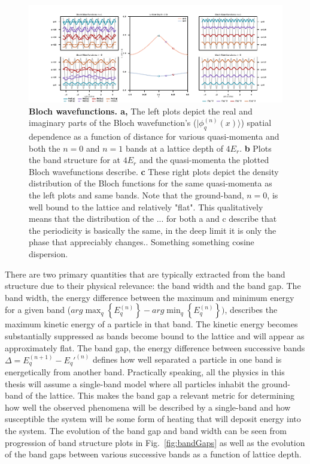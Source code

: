 \begin{figure}[ht!]
		\includegraphics[width=\columnwidth]{figures/ch1/blochFx/BlochFunctionsBS2.pdf} 
		\caption{\textbf{Bloch wavefunctions. a,} The left plots depict the real and imaginary parts of the Bloch wavefunction's ($ | \phi_q^{(n)} (x) \rangle$) spatial dependence as a function of distance for various quasi-momenta and both the $n=0$ and $n=1$ bands at a lattice depth of $4E_r$. \textbf{b} Plots the band structure for at $4E_r$ and the quasi-momenta  the plotted Bloch wavefunctions describe. \textbf{c} These right plots depict the density distribution of the Bloch functions for the same quasi-momenta as the left plots and same bands. Note that the ground-band, $n=0$, is well bound to the lattice and relatively "flat". This qualitatively means that the distribution of the ... for both a and c describe that the periodicity is basically the same, in the deep limit it is only the phase that appreciably changes.. Something something cosine dispersion.}
		\label{fig:blochFX}	
\end{figure}

There are two primary quantities that are typically extracted from the band structure due to their physical relevance: the band width and the band gap. The band width, the energy difference between the maximum and minimum energy for a given band ($arg \max_q {\left \{ E_q^{(n)}  \right \}}- arg \min_q { \left \{ E_q^{(n)} \right \} })$, describes the maximum kinetic energy of a particle in that band. The kinetic energy becomes substantially suppressed as bands become bound to the lattice and will appear as approximately flat. The band gap, the energy difference between successive bands $\Delta = E_q^{(n+1)} - E_q'^{(n)} $ defines how well separated a particle in one band is energetically from another band. Practically speaking, all the physics in this thesis will assume a single-band model where all particles inhabit  the ground-band of the lattice. This makes the band gap a relevant metric for determining how well the observed phenomena will be described by a single-band and how susceptible the system will be some form of heating that will deposit energy into the system. The evolution of the band gap and band width can be seen from progression of band structure plots in Fig.~\ref{fig:bandGaps} as well as the evolution of the band gaps between various successive bands as a function of lattice depth.

